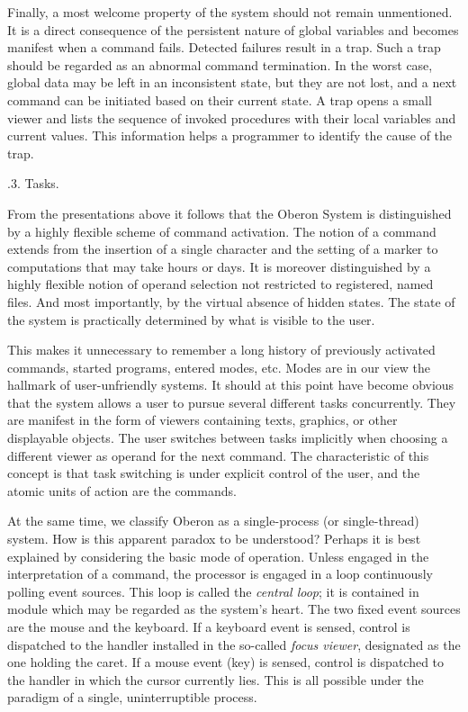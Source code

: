 Finally, a most welcome property of the system should not remain
unmentioned. It is a direct consequence of the persistent nature of
global variables and becomes manifest when a command fails. Detected
failures result in a trap. Such a trap should be regarded as an
abnormal command termination. In the worst case, global data may be
left in an inconsistent state, but they are not lost, and a next
command can be initiated based on their current state. A trap opens a
small viewer and lists the sequence of invoked procedures with their
local variables and current values. This information helps a
programmer to identify the cause of the trap.

.3. Tasks.

From the presentations above it follows that the Oberon System is
distinguished by a highly flexible scheme of command activation. The
notion of a command extends from the insertion of a single character
and the setting of a marker to computations that may take hours or
days. It is moreover distinguished by a highly flexible notion of
operand selection not restricted to registered, named files. And most
importantly, by the virtual absence of hidden states. The state of the
system is practically determined by what is visible to the user.

This makes it unnecessary to remember a long history of previously
activated commands, started programs, entered modes, etc. Modes are in
our view the hallmark of user-unfriendly systems. It should at this
point have become obvious that the system allows a user to pursue
several different tasks concurrently. They are manifest in the form of
viewers containing texts, graphics, or other displayable objects. The
user switches between tasks implicitly when choosing a different
viewer as operand for the next command. The characteristic of this
concept is that task switching is under explicit control of the user,
and the atomic units of action are the commands.

At the same time, we classify Oberon as a single-process (or
single-thread) system. How is this apparent paradox to be understood?
Perhaps it is best explained by considering the basic mode of
operation. Unless engaged in the interpretation of a command, the
processor is engaged in a loop continuously polling event
sources. This loop is called the \emph{central loop}; it is contained in
module  which may be regarded as the system's heart. The two
fixed event sources are the mouse and the keyboard. If a keyboard
event is sensed, control is dispatched to the handler installed in the
so-called \emph{focus viewer}, designated as the one holding the caret. If a
mouse event (key) is sensed, control is dispatched to the handler in
which the cursor currently lies. This is all possible under the
paradigm of a single, uninterruptible process.

